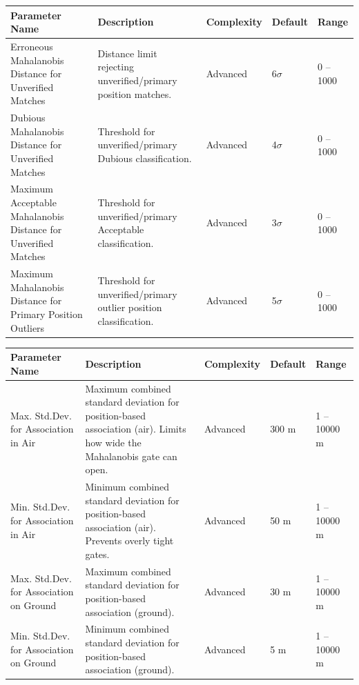 \begin{table}[H]
    \centering
    \footnotesize
    \hspace*{-1.5cm}
    \begin{tabular}{|p{4.5cm}|p{6.5cm}|l|l|l|}
    \hline
    \textbf{Parameter Name} & \textbf{Description} & \textbf{Complexity} & \textbf{Default} & \textbf{Range} \\ \hline
    Erroneous Mahalanobis Distance for Unverified Matches & Distance limit rejecting unverified/primary position matches. & Advanced & 6$\sigma$ & 0 -- 1000 \\ \hline
    Dubious Mahalanobis Distance for Unverified Matches & Threshold for unverified/primary Dubious classification. & Advanced & 4$\sigma$ & 0 -- 1000 \\ \hline
    Maximum Acceptable Mahalanobis Distance for Unverified Matches & Threshold for unverified/primary Acceptable classification. & Advanced & 3$\sigma$ & 0 -- 1000 \\ \hline
    Maximum Mahalanobis Distance for Primary Position Outliers & Threshold for unverified/primary outlier position classification. & Advanced & 5$\sigma$ & 0 -- 1000 \\ \hline
    \end{tabular}
\end{table}

\begin{table}[H]
    \centering
    \footnotesize
    \hspace*{-1.5cm}
    \begin{tabular}{|p{4.5cm}|p{6.5cm}|l|l|l|}
    \hline
    \textbf{Parameter Name} & \textbf{Description} & \textbf{Complexity} & \textbf{Default} & \textbf{Range} \\ \hline
    Max. Std.Dev. for Association in Air & Maximum combined standard deviation for position-based association (air). Limits how wide the Mahalanobis gate can open. & Advanced & 300 m & 1 -- 10000 m \\ \hline
    Min. Std.Dev. for Association in Air & Minimum combined standard deviation for position-based association (air). Prevents overly tight gates. & Advanced & 50 m & 1 -- 10000 m \\ \hline
    Max. Std.Dev. for Association on Ground & Maximum combined standard deviation for position-based association (ground). & Advanced & 30 m & 1 -- 10000 m \\ \hline
    Min. Std.Dev. for Association on Ground & Minimum combined standard deviation for position-based association (ground). & Advanced & 5 m & 1 -- 10000 m \\ \hline
    \end{tabular}
\end{table}
\ \\

